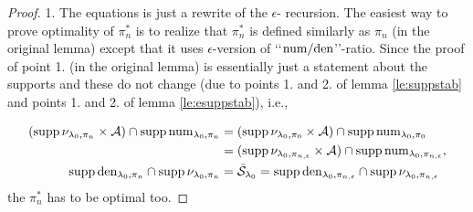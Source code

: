 \begin{proof}
1.
The equations is just a rewrite of
the $\epsilon$-\eUDRL{} recursion.
The easiest way to prove
optimality of $\pi_{n}^*$ is to realize that
$\pi_{n}^*$ is defined similarly as $\pi_n$ (in the original lemma)
except that it uses $\epsilon$-version of \lq\lq{}$\mathrm{num}/\mathrm{den}$\rq\rq{}-ratio.
Since the proof of point 1. (in the original lemma) is
essentially just a statement about the supports and these
do not change (due to points 1. and 2. of lemma \ref{le:suppstab} and points 1. and 2. of
lemma \ref{le:esuppstab}), i.e.,

\begin{align*}
( \operatorname*{\mathrm{supp}} \nu_{\mathit{\lambda}_0,\pi_n}  \times \mathcal{A} )
\cap \operatorname*{\mathrm{supp}} \mathrm{num}_{\mathit{\lambda}_0,\pi_n}
&=
( \operatorname*{\mathrm{supp}} \nu_{\mathit{\lambda}_0,\pi_0}  \times \mathcal{A} )
\cap \operatorname*{\mathrm{supp}} \mathrm{num}_{\mathit{\lambda}_0,\pi_0}
\\
&=
( \operatorname*{\mathrm{supp}} \nu_{\mathit{\lambda}_0,\pi_{n,\epsilon}}  \times \mathcal{A} )
\cap \operatorname*{\mathrm{supp}} \mathrm{num}_{\mathit{\lambda}_0,\pi_{n,\epsilon}},
\\
\operatorname*{\mathrm{supp}} \mathrm{den}_{\mathit{\lambda}_0,\pi_n}
\cap \operatorname*{\mathrm{supp}} \nu_{\mathit{\lambda}_0,\pi_n}
&=
\bar{\mathcal{S}}_{\mathit{\lambda}_0}
=
\operatorname*{\mathrm{supp}} \mathrm{den}_{\mathit{\lambda}_0,\pi_{n,\epsilon}}
\cap \operatorname*{\mathrm{supp}} \nu_{\mathit{\lambda}_0,\pi_{n,\epsilon}}
\end{align*}
the $\pi_n^*$ has to be optimal too.


\end{proof}
